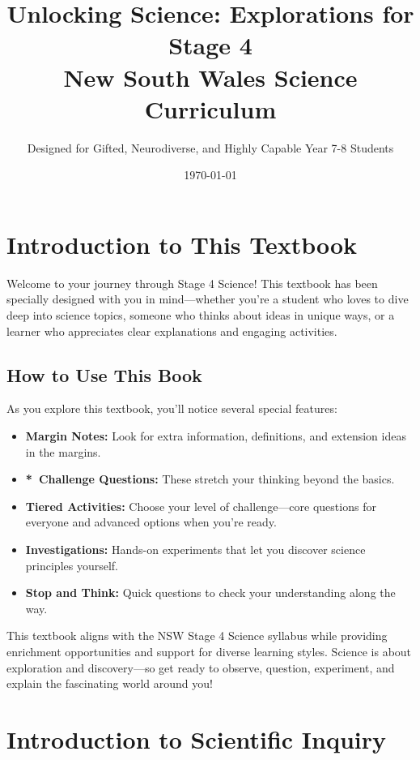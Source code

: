 \documentclass[justified,notoc]{tufte-book}
\title{Unlocking Science: Explorations for Stage 4\\
New South Wales Science Curriculum}
\author{Designed for Gifted, Neurodiverse, and Highly Capable Year 7-8 Students}
\date{\today}
\newcommand{\challengeicon}{*}
\begin{document}
\maketitle

\tableofcontents

\chapter*{Introduction to This Textbook}

Welcome to your journey through Stage 4 Science! This textbook has been specially designed with you in mind—whether you're a student who loves to dive deep into science topics, someone who thinks about ideas in unique ways, or a learner who appreciates clear explanations and engaging activities.

\section*{How to Use This Book}

As you explore this textbook, you'll notice several special features:

\begin{itemize}
    \item \textbf{Margin Notes:} Look for extra information, definitions, and extension ideas in the margins.
    \item \textbf{\challengeicon\ Challenge Questions:} These stretch your thinking beyond the basics.
    \item \textbf{Tiered Activities:} Choose your level of challenge—core questions for everyone and advanced options when you're ready.
    \item \textbf{Investigations:} Hands-on experiments that let you discover science principles yourself.
    \item \textbf{Stop and Think:} Quick questions to check your understanding along the way.
\end{itemize}

This textbook aligns with the NSW Stage 4 Science syllabus while providing enrichment opportunities and support for diverse learning styles. Science is about exploration and discovery—so get ready to observe, question, experiment, and explain the fascinating world around you!

\chapter{Introduction to Scientific Inquiry}
\end{document}
